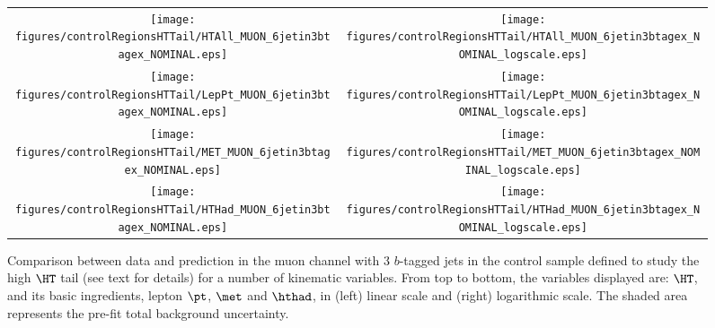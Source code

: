 \begin{figure}[htbp]
\begin{center}
\begin{tabular}{cc}
%
\texttt{[image: figures/controlRegionsHTTail/HTAll\_MUON\_6jetin3btagex\_NOMINAL.eps]} &
\texttt{[image: figures/controlRegionsHTTail/HTAll\_MUON\_6jetin3btagex\_NOMINAL\_logscale.eps]} \\
\texttt{[image: figures/controlRegionsHTTail/LepPt\_MUON\_6jetin3btagex\_NOMINAL.eps]} &
\texttt{[image: figures/controlRegionsHTTail/LepPt\_MUON\_6jetin3btagex\_NOMINAL\_logscale.eps]} \\
\texttt{[image: figures/controlRegionsHTTail/MET\_MUON\_6jetin3btagex\_NOMINAL.eps]} &
\texttt{[image: figures/controlRegionsHTTail/MET\_MUON\_6jetin3btagex\_NOMINAL\_logscale.eps]} \\
\texttt{[image: figures/controlRegionsHTTail/HTHad\_MUON\_6jetin3btagex\_NOMINAL.eps]} &
\texttt{[image: figures/controlRegionsHTTail/HTHad\_MUON\_6jetin3btagex\_NOMINAL\_logscale.eps]} \\

\end{tabular}\caption{\small {Comparison between data and prediction in the muon channel with 3 $b$-tagged jets in the control sample
defined to study the high $\HT$ tail (see text for details)  for a number of kinematic
variables. From top to bottom, the variables displayed are: $\HT$, and its basic ingredients, lepton $\pt$, $\met$ and $\hthad$,
in (left) linear scale and (right) logarithmic scale.
The shaded area represents the pre-fit total background uncertainty.}}
\label{fig:MUON_controlHTTail_3btagex_1}
\end{center}
\end{figure}
